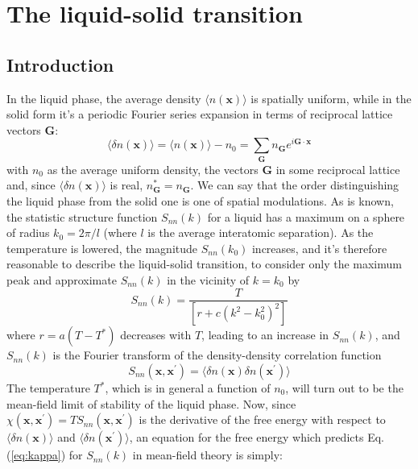 \documentclass[12pt,a4paper]{article}
\begin{document}
 \section{The liquid-solid transition}

\subsection{Introduction}

 In the liquid phase, the average density $\langle n(\textbf{x}) \rangle$ is spatially uniform, while in the solid form it's a periodic Fourier series expansion in terms of reciprocal lattice vectors $\textbf{G}$:
\begin{equation} \label{inizio}
\langle \delta n(\textbf{x}) \rangle = \langle n(\textbf{x}) \rangle - n_0 =\sum_\textbf{G} n_\textbf{G} e^{i\textbf{G} \cdot \textbf{x}}
\end{equation}
with $n_0$ as the average uniform density, the vectors $\textbf{G}$ in some reciprocal lattice and, since $\langle \delta n(\textbf{x}) \rangle$ is real, $ n^*_\textbf{G} = n_\textbf{G}$. We can say that the order distinguishing the liquid phase from the solid one is one of spatial modulations. As is known, the statistic structure function $S_{nn}(k)$ for a liquid has a maximum on a sphere of radius $k_0 = 2 \pi / l$ (where $l$ is the average interatomic separation). As the temperature is lowered, the magnitude $S_{nn}(k_0)$ increases, and it's therefore reasonable to describe the liquid-solid transition, to consider only the maximum peak and approximate $S_{nn}(k)$ in the vicinity of $k=k_0$ by
\begin{equation}
\label{eq:kappa}
S_{nn}(k)=\frac{T}{[r+c(k^2-k^2_0)^2]}
\end{equation}
 where $r=a(T-T^*)$ decreases with $T$, leading to an increase in $S_{nn}(k)$, and $S_{nn}(k)$ is the Fourier transform of the density-density correlation function
\begin{equation}
S_{nn}( \textbf{x}, \textbf{x} ^\prime)= \langle \delta n(\textbf{x})\delta n(\textbf{x}^\prime) \rangle
\end{equation}
The temperature $T^*$, which is in general a function of $n_0$, will turn out to be the mean-field limit of stability of the liquid phase.
Now, since $\chi( \textbf{x} ,\textbf{x} ^\prime) = T S_{nn} ( \textbf{x} ,\textbf{x} ^\prime)$ is the derivative of the free energy  with respect to $ \langle \delta n(\textbf{x})\rangle$ and  $\langle \delta n(\textbf{x}^\prime)\rangle$, an equation for the free energy which predicts Eq.(\ref{eq:kappa}) for $S_{nn}(k)$ in mean-field theory is simply:
\end{document}
